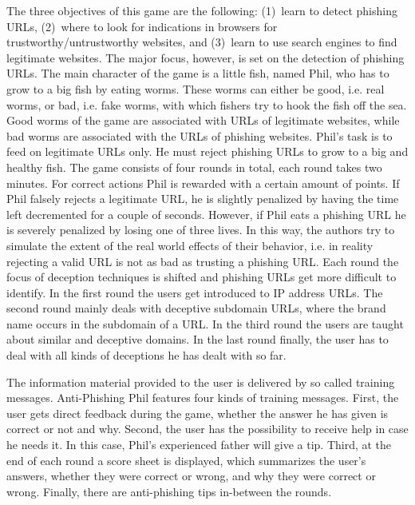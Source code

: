 \begin{description}[leftmargin=0cm]
	\item[Game Design and Rules:] The three objectives of this game are the following: 
(1)~learn to detect phishing URLs, (2)~where to look for indications in browsers for trustworthy/untrustworthy websites, and (3)~learn to use search engines to find legitimate websites. 
The major focus, however, is set on the detection of phishing URLs. 
The main character of the game is a little fish, named Phil, who has to grow to a big fish by eating worms. 
These worms can either be good, i.e. real worms, or bad, i.e. fake worms, with which fishers try to hook the fish off the sea. 
Good worms of the game are associated with URLs of legitimate websites, while bad worms are associated with the URLs of phishing websites. 
Phil's task is to feed on legitimate URLs only. 
He must reject phishing URLs to grow to a big and healthy fish. 
The game consists of four rounds in total, each round takes two minutes. 
For correct actions Phil is rewarded with a certain amount of points. 
If Phil falsely rejects a legitimate URL, he is slightly penalized by having the time left decremented for a couple of seconds. 
However, if Phil eats a phishing URL he is severely penalized by losing one of three lives. 
In this way, the authors try to simulate the extent of the real world effects of their behavior, i.e.
in reality rejecting a valid URL is not as bad as trusting a phishing URL.
Each round the focus of deception techniques is shifted and phishing URLs get more difficult to identify. 
In the first round the users get introduced to IP address URLs. 
The second round mainly deals with deceptive subdomain URLs, where the brand name occurs in the subdomain of a URL. 
In the third round the users are taught about similar and deceptive domains. 
In the last round finally, the user has to deal with all kinds of deceptions he has dealt with so far. 
\item[Feedback:]
The information material provided to the user is delivered by so called training messages. 
Anti-Phishing Phil features four kinds of training messages. 
First, the user gets direct feedback during the game, whether the answer he has given is correct or not and why. 
Second, the user has the possibility to receive help in case he needs it. 
In this case, Phil's experienced father will give a tip. 
Third, at the end of each round a score sheet is displayed, which summarizes the user's answers, whether they were correct or wrong, and why they were correct or wrong. 
Finally, there are anti-phishing tips in-between the rounds.

\end{description}
